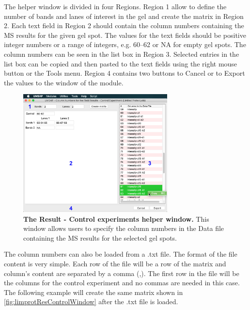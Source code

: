 The helper window is divided in four Regions. Region \num{1} allow to define the number of bands and lanes of interest in the gel and create the matrix in Region \num{2}. Each text field in Region \num{2} should contain the column numbers containing the MS results for the given gel spot. The values for the text fields should be positive integer numbers or a range of integers, e.g. \numrange[range-phrase=--]{60}{62} or NA for empty gel spots. The column numbers can be seen in the list box in Region \num{3}. Selected entries in the list box can be copied and then pasted to the text fields using the right mouse button or the Tools menu. Region \num{4} contains two buttons to Cancel or to Export the values to the window of the module. 

\begin{figure}[h]
	\centering
	\includegraphics[width=0.7\textwidth]{./IMAGES/MOD-LIMPROT/limprot-rescontrol.jpg}
	\caption[The Result - Control experiments helper window for the Limited Proteolysis module]{\textbf{The Result - Control experiments helper window.} This window allows users to specify the column numbers in the Data file containing the MS results for the selected gel spots.} 
	\label{fig:limprotResControlWindow}
	\vspace{-5pt} 	
\end{figure}

The column numbers can also be loaded from a .txt file. The format of the file content is very simple. Each row of the file will be a row of the matrix and column's content are separated by a comma (,). The first row in the file will be the columns for the control experiment and no commas are needed in this case. The following example will create the same matrix shown in \autoref{fig:limprotResControlWindow} after the .txt file is loaded.


